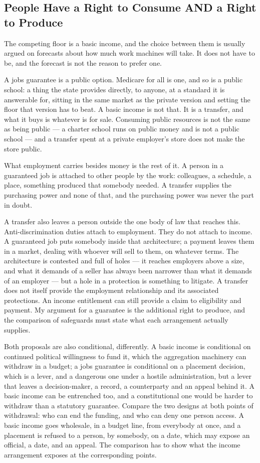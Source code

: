 \subsection{People Have a Right to Consume AND a Right to Produce}
\label{sec:right-consume}
The competing floor is a basic income, and the choice between them is usually argued on forecasts about how much work machines will take. It does not have to be, and the forecast is not the reason to prefer one.

A jobs guarantee is a public option. Medicare for all is one, and so is a public school: a thing the state provides directly, to anyone, at a standard it is answerable for, sitting in the same market as the private version and setting the floor that version has to beat. A basic income is not that. It is a transfer, and what it buys is whatever is for sale. Consuming public resources is not the same as being public — a charter school runs on public money and is not a public school — and a transfer spent at a private employer's store does not make the store public.

What employment carries besides money is the rest of it. A person in a guaranteed job is attached to other people by the work: colleagues, a schedule, a place, something produced that somebody needed. A transfer supplies the purchasing power and none of that, and the purchasing power was never the part in doubt.

A transfer also leaves a person outside the one body of law that reaches this. Anti-discrimination duties attach to employment. They do not attach to income. A guaranteed job puts somebody inside that architecture; a payment leaves them in a market, dealing with whoever will sell to them, on whatever terms. The architecture is contested and full of holes — it reaches employers above a size, and what it demands of a seller has always been narrower than what it demands of an employer — but a hole in a protection is something to litigate. A transfer does not itself provide the employment relationship and its associated protections. An income entitlement can still provide a claim to eligibility and payment. My argument for a guarantee is the additional right to produce, and the comparison of safeguards must state what each arrangement actually supplies.

Both proposals are also conditional, differently. A basic income is conditional on continued political willingness to fund it, which the aggregation machinery can withdraw in a budget; a jobs guarantee is conditional on a placement decision, which is a lever, and a dangerous one under a hostile administration, but a lever that leaves a decision-maker, a record, a counterparty and an appeal behind it. A basic income can be entrenched too, and a constitutional one would be harder to withdraw than a statutory guarantee. Compare the two designs at both points of withdrawal: who can end the funding, and who can deny one person access. A basic income goes wholesale, in a budget line, from everybody at once, and a placement is refused to a person, by somebody, on a date, which may expose an official, a date, and an appeal. The comparison has to show what the income arrangement exposes at the corresponding points.

